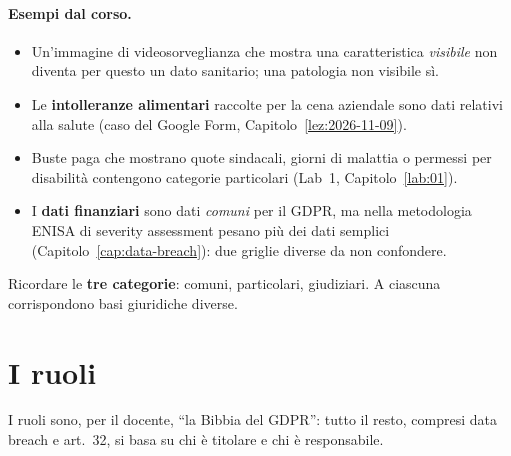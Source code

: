 \paragraph{Esempi dal corso.}
\begin{itemize}
  \item Un'immagine di videosorveglianza che mostra una caratteristica \emph{visibile} non diventa per
    questo un dato sanitario; una patologia non visibile sì.
  \item Le \textbf{intolleranze alimentari} raccolte per la cena aziendale sono dati relativi alla
    salute (caso del Google Form, Capitolo~\ref{lez:2026-11-09}).
  \item Buste paga che mostrano quote sindacali, giorni di malattia o permessi per disabilità contengono
    categorie particolari (Lab~1, Capitolo~\ref{lab:01}).
  \item I \textbf{dati finanziari} sono dati \emph{comuni} per il GDPR, ma nella metodologia ENISA di
    severity assessment pesano più dei dati semplici (Capitolo~\ref{cap:data-breach}): due griglie
    diverse da non confondere.
\end{itemize}

\begin{esame}
Ricordare le \textbf{tre categorie}: comuni, particolari, giudiziari. A ciascuna corrispondono basi
giuridiche diverse.
\end{esame}

\section{I ruoli}
\label{sec:gdpr-ruoli}

I ruoli sono, per il docente, ``la Bibbia del GDPR'': tutto il resto, compresi data breach e art.~32,
si basa su chi è titolare e chi è responsabile.

